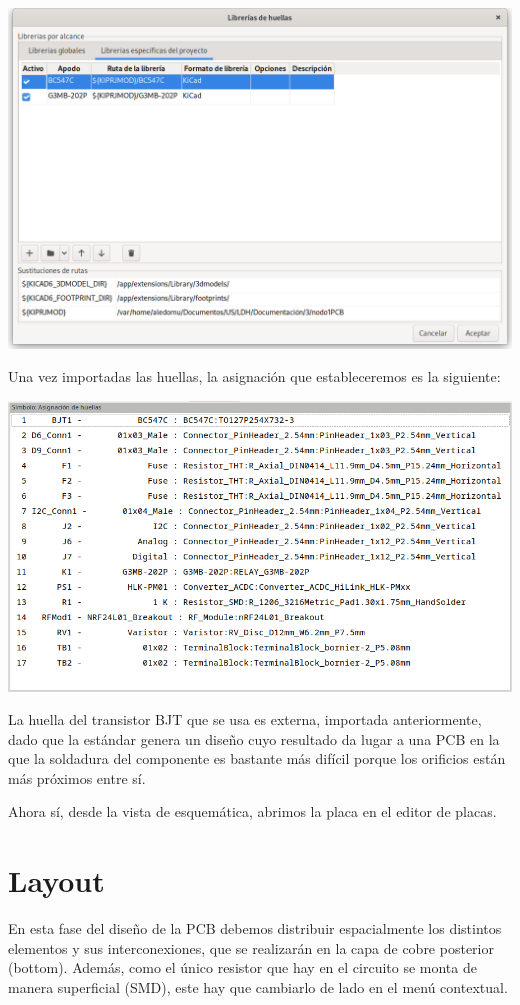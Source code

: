 \includegraphics[width=\linewidth]{footprint-path.png}

Una vez importadas las huellas, la asignación que estableceremos es la
siguiente:

\includegraphics[width=\linewidth]{footprint-assignment.png}

La huella del transistor BJT que se usa es externa, importada anteriormente,
dado que la estándar genera un diseño cuyo resultado da lugar a una PCB en la
que la soldadura del componente es bastante más difícil porque los orificios
están más próximos entre sí.

Ahora sí, desde la vista de esquemática, abrimos la placa en el editor de
placas.

\section{Layout}

En esta fase del diseño de la PCB debemos distribuir espacialmente los
distintos elementos y sus interconexiones, que se realizarán en la capa de
cobre posterior (bottom). Además, como el único resistor que hay en el circuito
se monta de manera superficial (SMD), este hay que cambiarlo de lado en el menú
contextual.

